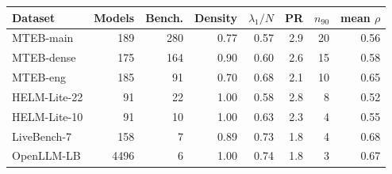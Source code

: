 \begin{tabular}{lrrrrrrr}\toprule
Dataset & Models & Bench. & Density & $\lambda_1/N$ & PR & $n_{90}$ & mean $\rho$ \\\midrule
MTEB-main & 189 & 280 & 0.77 & 0.57 & 2.9 & 20 & 0.56 \\
MTEB-dense & 175 & 164 & 0.90 & 0.60 & 2.6 & 15 & 0.58 \\
MTEB-eng & 185 & 91 & 0.70 & 0.68 & 2.1 & 10 & 0.65 \\
HELM-Lite-22 & 91 & 22 & 1.00 & 0.58 & 2.8 & 8 & 0.52 \\
HELM-Lite-10 & 91 & 10 & 1.00 & 0.63 & 2.3 & 4 & 0.55 \\
LiveBench-7 & 158 & 7 & 0.89 & 0.73 & 1.8 & 4 & 0.68 \\
OpenLLM-LB & 4496 & 6 & 1.00 & 0.74 & 1.8 & 3 & 0.67 \\
\bottomrule\end{tabular}

